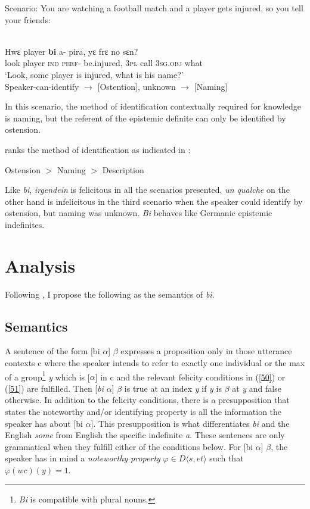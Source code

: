 \documentclass[output=paper,modfonts,nonflat,draftmode]{langsci/langscibook}
\begin{document}

 Scenario: You are watching a football match and a player gets injured, so you tell your friends:

 \ea\label{owusu:ex45c}\\
\gll Hwε player \textbf{bi} a- pira, yε frε no sεn?\\
look player  \textsc{ind} \textsc{perf}- be.injured, \textsc{3pl} call \textsc{3sg}.\textsc{obj} what\\
\glt `Look, some player is injured, what is his name?'\\
	Speaker-can-identify $\rightarrow$ [Ostention], unknown $\rightarrow$  [Naming]

 \z In this scenario, the method of identification contextually required for knowledge is naming, but the referent of the epistemic definite can only be identified by ostension.
 
 \citet{Aloni2001} ranks the method of identification as indicated in :
 
 \ea \label{ex:alonimethod} Ostension $>$ Naming $>$ Description \z
 
Like \emph{bi}, \emph{irgendein} is felicitous in all the scenarios presented, \emph{un qualche} on the other hand is infelicitous in the third scenario when the speaker could identify by ostension, but naming was unknown. \emph{Bi} behaves like Germanic epistemic indefinites.

\section{Analysis}\label{sec:owusu:4}
Following \citet{Ionin2013}, I propose the following as the semantics of \emph{bi}.

\subsection{Semantics} A sentence of the form [bi $\alpha$] $\beta$ expresses a proposition only in those utterance contexts c where the speaker intends to refer to exactly one individual or the max of a group\footnote{\emph{Bi} is compatible with plural nouns.} \emph{y} which is [$\alpha$] in c and the relevant felicity conditions in (\ref{50}) or (\ref{51}) are fulfilled. Then [\emph{bi} $\alpha$] $\beta$ is true at an index \emph{y} if \emph{y} is $\beta$ at \emph{y} and false otherwise. In addition to the felicity conditions, there is a presupposition that states the noteworthy and/or identifying property is all the information the speaker has about [bi $\alpha$]. This presupposition is what differentiates \emph{bi} and the English \emph{some} from English the specific indefinite \emph{a}.   
These sentences are only grammatical when they fulfill either of the conditions below. 
\ea
\ea \label{50} For [bi $\alpha$] $\beta$, the speaker has in mind a \textit{noteworthy property} $\varphi \in D\langle s,et\rangle$ such that $\varphi (wc)(y) = 1$.
\end{document}
